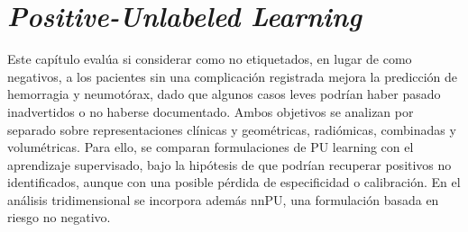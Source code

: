 \chapter{\textit{Positive-Unlabeled Learning}}\label{chap:pu_learning}





Este capítulo evalúa si considerar como no etiquetados, en lugar de como negativos, a los pacientes sin una complicación registrada mejora la predicción de hemorragia y neumotórax, dado que algunos casos leves podrían haber pasado inadvertidos o no haberse documentado. Ambos objetivos se analizan por separado sobre representaciones clínicas y geométricas, radiómicas, combinadas y volumétricas. Para ello, se comparan formulaciones de PU learning con el aprendizaje supervisado, bajo la hipótesis de que podrían recuperar positivos no identificados, aunque con una posible pérdida de especificidad o calibración. En el análisis tridimensional se incorpora además nnPU, una formulación basada en riesgo no negativo.


